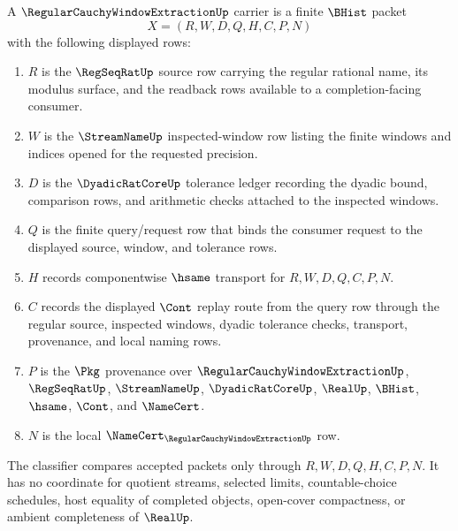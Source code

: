 \begin{definition}
\label{def:regular-cauchy-window-extraction-carrier}
A $\RegularCauchyWindowExtractionUp$ carrier is a finite $\BHist$ packet
$$
X=(R,W,D,Q,H,C,P,N)
$$
with the following displayed rows:
\begin{enumerate}
\item $R$ is the $\RegSeqRatUp$ source row carrying the regular rational name, its modulus surface, and the readback rows available to a completion-facing consumer.
\item $W$ is the $\StreamNameUp$ inspected-window row listing the finite windows and indices opened for the requested precision.
\item $D$ is the $\DyadicRatCoreUp$ tolerance ledger recording the dyadic bound, comparison rows, and arithmetic checks attached to the inspected windows.
\item $Q$ is the finite query/request row that binds the consumer request to the displayed source, window, and tolerance rows.
\item $H$ records componentwise $\hsame$ transport for $R,W,D,Q,C,P,N$.
\item $C$ records the displayed $\Cont$ replay route from the query row through the regular source, inspected windows, dyadic tolerance checks, transport, provenance, and local naming rows.
\item $P$ is the $\Pkg$ provenance over $\RegularCauchyWindowExtractionUp$, $\RegSeqRatUp$, $\StreamNameUp$, $\DyadicRatCoreUp$, $\RealUp$, $\BHist$, $\hsame$, $\Cont$, and $\NameCert$.
\item $N$ is the local $\NameCert_{\RegularCauchyWindowExtractionUp}$ row.
\end{enumerate}
The classifier compares accepted packets only through $R,W,D,Q,H,C,P,N$. It has no coordinate for quotient streams, selected limits, countable-choice schedules, host equality of completed objects, open-cover compactness, or ambient completeness of $\RealUp$.
\end{definition}

